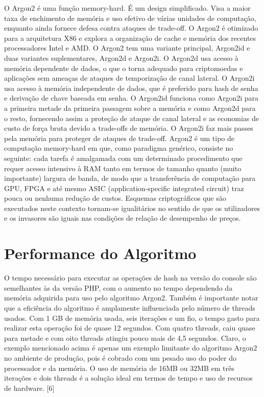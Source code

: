 \documentclass[conference]{IEEEtran}
\begin{document}
O Argon2 é uma função memory-hard. É um design simplificado. 
Visa a maior taxa de enchimento de memória e uso efetivo de várias unidades de computação, 
enquanto ainda fornece defesa contra ataques de trade-off. 
O Argon2 é otimizado para a arquitetura X86 e explora a organização de cache e memória dos recentes processadores Intel e AMD. 
O Argon2 tem uma variante principal, Argon2id e duas variantes suplementares, Argon2d e Argon2i. 
O Argon2d usa acesso à memória dependente de dados, o que o torna adequado para criptomoedas e 
aplicações sem ameaças de ataques de temporização de canal lateral. O Argon2i usa acesso à memória independente de dados, 
que é preferido para hash de senha e derivação de chave baseada em senha. 
O Argon2id funciona como Argon2i para a primeira metade da primeira passagem sobre a memória e como Argon2d para o resto, 
fornecendo assim a proteção de ataque de canal lateral e as economias de custo de força bruta devido a trade-offs de memória. 
O Argon2i faz mais passes pela memória para proteger de ataques de trade-off. \cite{rfc9106}
Argon2 é um tipo de computação memory-hard em que, como paradigma genérico, consiste no seguinte: 
cada tarefa é amalgamada com um determinado procedimento que requer acesso intensivo à RAM tanto em termos de tamanho quanto 
(muito importante) largura de banda, de modo que a transferência de computação para GPU, 
FPGA e até mesmo ASIC (application-specific integrated circuit) traz pouca ou nenhuma redução de custos. 
Esquemas criptográficos que são executados neste contexto tornam-se igualitários no sentido de que os utilizadores e 
os invasores são iguais nas condições de relação de desempenho de preços. \cite{rfc9106}

\section{Performance do Algoritmo}

O tempo necessário para executar as operações de hash na versão do console são semelhantes às da versão PHP, 
com o aumento no tempo dependendo da memória adquirida para uso pelo algoritmo Argon2. 
Também é importante notar que a eficiência do algoritmo é amplamente influenciada pelo número de threads usados. 
Com 1 GB de memória usada, seis iterações e um fio, o tempo gasto para realizar esta operação foi de quase 12 segundos. 
Com quatro threads, caiu quase para metade e com oito threads atingiu pouco mais de 4,5 segundos. Claro, 
o exemplo mencionado acima é apenas um exemplo limitante do algoritmo Argon2 no ambiente de produção, 
pois é cobrado com um pesado uso do poder do processador e da memória. 
O uso de memória de 16MB ou 32MB em três iterações e dois threads é a solução ideal em termos de 
tempo e uso de recursos de hardware. [6]\cite{rfc9106}
\end{document}
